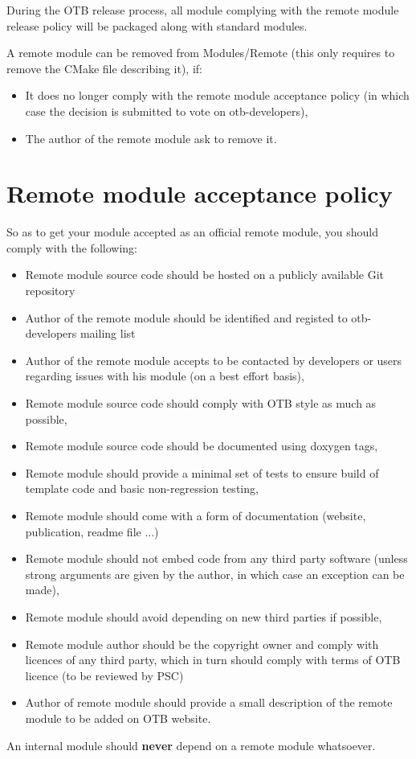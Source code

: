 During the OTB release process, all module complying with the remote module release policy will be packaged along with standard modules.

A remote module can be removed from Modules/Remote (this only requires to remove the CMake file describing it), if: 

\begin{itemize}
       \item  It does no longer comply with the remote module acceptance policy (in which case the decision is submitted to vote on otb-developers), 
       \item  The author of the remote module ask to remove it. 
\end{itemize}

\section{Remote module acceptance policy }

So as to get your module accepted as an official remote module, you should comply with the following:
\begin{itemize}
	\item Remote module source code should be hosted on a publicly available Git repository
	\item Author of the remote module should be identified and registed to otb-developers mailing list
	\item Author of the remote module accepts to be contacted by developers or users regarding issues with his module (on a best effort basis),
	\item Remote module source code should comply with OTB style as much as possible,
	\item Remote module source code should be documented using doxygen tags,
	\item Remote module should provide a minimal set of tests to ensure build of template code and basic non-regression testing,
	\item Remote module should come with a form of documentation (website, publication, readme file ...)
	\item Remote module should not embed code from any third party software (unless strong arguments are given by the author, in which case an exception can be made),
	\item Remote module should avoid depending on new third parties if possible,
	\item Remote module author should be the copyright owner and comply with licences of any third party, which in turn should comply with terms of OTB licence (to be reviewed by PSC)
	\item Author of remote module should provide a small description of the remote module to be added on OTB website. 
\end{itemize}
An internal module should \textbf{never} depend on a remote module whatsoever. 

